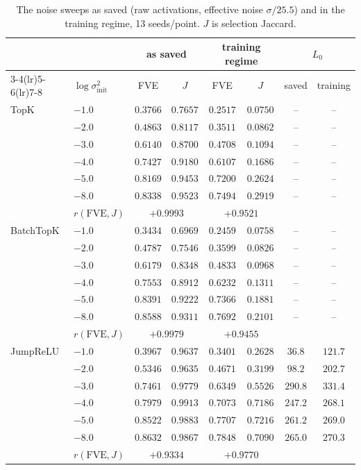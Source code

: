 \documentclass[11pt]{article}
\begin{document}
\begin{table}[h]
\centering
\caption{The noise sweeps as saved (raw activations, effective noise
$\sigma/25.5$) and in the training regime, 13 seeds/point. $J$ is selection
Jaccard.}
\label{tab:regime}
\small\setlength{\tabcolsep}{4pt}
\begin{tabular}{llcccccc}
\toprule
& & \multicolumn{2}{c}{as saved} & \multicolumn{2}{c}{training regime} & \multicolumn{2}{c}{$L_0$} \\
\cmidrule(lr){3-4}\cmidrule(lr){5-6}\cmidrule(lr){7-8}
& $\log\sigma^2_{\mathrm{init}}$ & FVE & $J$ & FVE & $J$ & saved & training \\
\midrule
TopK & $-1.0$ & $0.3766$ & $0.7657$ & $0.2517$ & $0.0750$ & -- & -- \\
 & $-2.0$ & $0.4863$ & $0.8117$ & $0.3511$ & $0.0862$ & -- & -- \\
 & $-3.0$ & $0.6140$ & $0.8700$ & $0.4708$ & $0.1094$ & -- & -- \\
 & $-4.0$ & $0.7427$ & $0.9180$ & $0.6107$ & $0.1686$ & -- & -- \\
 & $-5.0$ & $0.8169$ & $0.9453$ & $0.7200$ & $0.2624$ & -- & -- \\
 & $-8.0$ & $0.8338$ & $0.9523$ & $0.7494$ & $0.2919$ & -- & -- \\
 & $r(\mathrm{FVE},J)$ & \multicolumn{2}{c}{$+0.9993$} & \multicolumn{2}{c}{$+0.9521$} & & \\
\midrule
BatchTopK & $-1.0$ & $0.3434$ & $0.6969$ & $0.2459$ & $0.0758$ & -- & -- \\
 & $-2.0$ & $0.4787$ & $0.7546$ & $0.3599$ & $0.0826$ & -- & -- \\
 & $-3.0$ & $0.6179$ & $0.8348$ & $0.4833$ & $0.0968$ & -- & -- \\
 & $-4.0$ & $0.7553$ & $0.8912$ & $0.6232$ & $0.1311$ & -- & -- \\
 & $-5.0$ & $0.8391$ & $0.9222$ & $0.7366$ & $0.1881$ & -- & -- \\
 & $-8.0$ & $0.8588$ & $0.9311$ & $0.7692$ & $0.2101$ & -- & -- \\
 & $r(\mathrm{FVE},J)$ & \multicolumn{2}{c}{$+0.9979$} & \multicolumn{2}{c}{$+0.9455$} & & \\
\midrule
JumpReLU & $-1.0$ & $0.3967$ & $0.9637$ & $0.3401$ & $0.2628$ & $36.8$ & $121.7$ \\
 & $-2.0$ & $0.5346$ & $0.9635$ & $0.4671$ & $0.3199$ & $98.2$ & $202.7$ \\
 & $-3.0$ & $0.7461$ & $0.9779$ & $0.6349$ & $0.5526$ & $290.8$ & $331.4$ \\
 & $-4.0$ & $0.7979$ & $0.9913$ & $0.7073$ & $0.7186$ & $247.2$ & $268.1$ \\
 & $-5.0$ & $0.8522$ & $0.9883$ & $0.7707$ & $0.7216$ & $261.2$ & $269.0$ \\
 & $-8.0$ & $0.8632$ & $0.9867$ & $0.7848$ & $0.7090$ & $265.0$ & $270.3$ \\
 & $r(\mathrm{FVE},J)$ & \multicolumn{2}{c}{$+0.9334$} & \multicolumn{2}{c}{$+0.9770$} & & \\
\bottomrule
\end{tabular}
\end{table}
\end{document}
